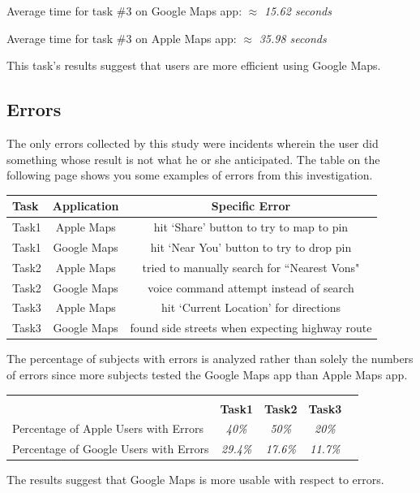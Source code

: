 \documentclass[a4paper; 11pt]{article}
\begin{document}
\begin{center}
\vspace{-.4in}
\par
Average time for task \#3 on Google Maps app: $ \approx $ \textit{15.62 seconds}
\par
Average time for task \#3 on Apple Maps app: $ \approx $ \textit{35.98 seconds}
\end{center}
\par
\noindent
This task's results suggest that users are more efficient using Google Maps. 

\subsection{Errors}
\par
The only errors collected by this study were incidents wherein the user did something whose result is not what he or she anticipated. The table on the following page shows you some examples of errors from this investigation.

\begin{table}[ht]
\centering
\begin{tabular}{l|c|c}
Task & Application & Specific Error\\\hline
Task1 & Apple Maps & hit `Share' button to try to map to pin \\
Task1 & Google Maps & hit `Near You' button to try to drop pin\\
Task2 & Apple Maps & tried to manually search for ``Nearest Vons"\\
Task2 & Google Maps & voice command attempt instead of search\\
Task3 & Apple Maps & hit `Current Location' for directions\\
Task3 & Google Maps & found side streets when expecting highway route
\end{tabular}
\end{table}
\par
The percentage of subjects with errors is analyzed rather than solely the numbers of errors since more subjects tested the Google Maps app than Apple Maps app.
\begin{table}[ht]
\begin{tabular}{l c c c c}
& \multicolumn{4}{c}{}\\ %
& \textbf{Task1} & \textbf{Task2} & \textbf{Task3} \\
Percentage of Apple Users with Errors & \textit{40\%} & \textit{50\%}  & \textit{20\%} \\
Percentage of Google Users with Errors & \textit{29.4\%} & \textit{17.6\%}  & \textit{11.7\%} \\

\end{tabular}

\end{table}
\par
The results suggest that Google Maps is more usable with respect to errors.
\end{document}
